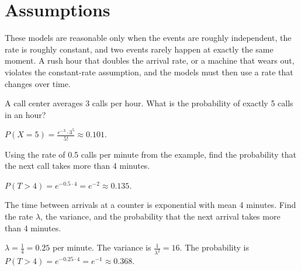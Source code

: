 \section{Assumptions}
These models are reasonable only when the events are roughly independent, the rate is roughly constant, and two events
rarely happen at exactly the same moment. A rush hour that doubles the arrival rate, or a machine that wears out, violates the
constant-rate assumption, and the models must then use a rate that changes over time.

\begin{Exercise}[label=pe1, title=Poisson probability]
A call center averages 3 calls per hour. What is the probability of exactly 5 calls in an hour?
\end{Exercise}
\begin{Answer}[ref=pe1]
$P(X = 5) = \frac{e^{-3} \cdot 3^5}{5!} \approx 0.101$.
\end{Answer}

\begin{Exercise}[label=pe2, title=Exponential tail]
Using the rate of 0.5 calls per minute from the example, find the probability that the next call takes more than 4 minutes.
\end{Exercise}
\begin{Answer}[ref=pe2]
$P(T > 4) = e^{-0.5 \cdot 4} = e^{-2} \approx 0.135$.
\end{Answer}

\begin{Exercise}[label=pe3, title=Mean and variance]
The time between arrivals at a counter is exponential with mean 4 minutes. Find the rate $\lambda$, the variance, and the probability that the next arrival takes more than 4 minutes.
\end{Exercise}
\begin{Answer}[ref=pe3]
$\lambda = \frac{1}{4} = 0.25$ per minute. The variance is $\frac{1}{\lambda^2} = 16$. The probability is $P(T > 4) = e^{-0.25 \cdot 4} = e^{-1} \approx 0.368$.
\end{Answer}

